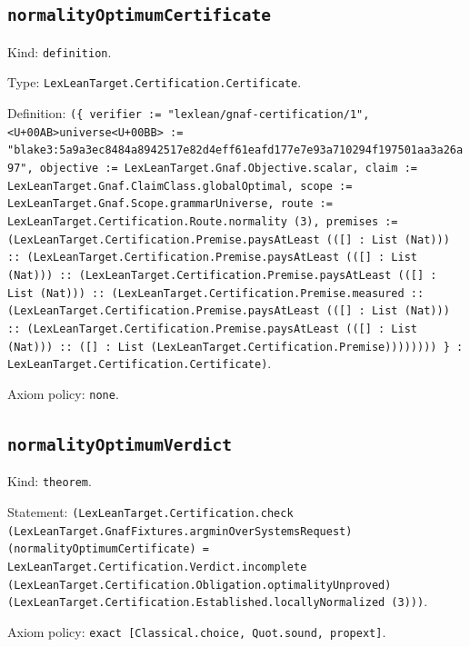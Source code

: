 \documentclass[11pt]{article}
\begin{document}
\subsection*{\texttt{normalityOptimumCertificate}}
\noindent Kind: \texttt{definition}.\par
\noindent Type: \texttt{LexLeanTarget.Certification.Certificate}.\par
\noindent Definition: \texttt{(\{ verifier := "lexlean/gnaf-certification/1", <U+00AB>universe<U+00BB> := "blake3:5a9a3ec8484a8942517e82d4eff61eafd177e7e93a710294f197501aa3a26a97", objective := LexLeanTarget.Gnaf.Objective.scalar, claim := LexLeanTarget.Gnaf.ClaimClass.globalOptimal, scope := LexLeanTarget.Gnaf.Scope.grammarUniverse, route := LexLeanTarget.Certification.Route.normality (3), premises := (LexLeanTarget.Certification.Premise.paysAtLeast (([] : List (Nat))) :: (LexLeanTarget.Certification.Premise.paysAtLeast (([] : List (Nat))) :: (LexLeanTarget.Certification.Premise.paysAtLeast (([] : List (Nat))) :: (LexLeanTarget.Certification.Premise.measured :: (LexLeanTarget.Certification.Premise.paysAtLeast (([] : List (Nat))) :: (LexLeanTarget.Certification.Premise.paysAtLeast (([] : List (Nat))) :: ([] : List (LexLeanTarget.Certification.Premise)))))))) \} : LexLeanTarget.Certification.Certificate)}.\par
\noindent Axiom policy: \texttt{none}.\par
\subsection*{\texttt{normalityOptimumVerdict}}
\noindent Kind: \texttt{theorem}.\par
\noindent Statement: \texttt{(LexLeanTarget.Certification.check (LexLeanTarget.GnafFixtures.argminOverSystemsRequest) (normalityOptimumCertificate) = LexLeanTarget.Certification.Verdict.incomplete (LexLeanTarget.Certification.Obligation.optimalityUnproved) (LexLeanTarget.Certification.Established.locallyNormalized (3)))}.\par
\noindent Axiom policy: \texttt{exact [Classical.choice, Quot.sound, propext]}.\par
\end{document}

